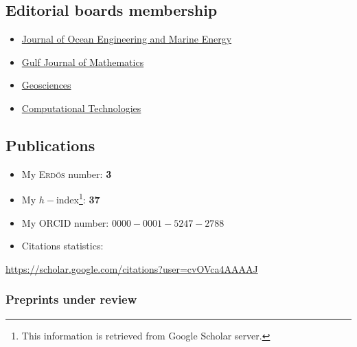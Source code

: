 \documentclass[final, a4paper, oneside, 12pt]{article}
\numberwithin{equation}{section}
\begin{document}
\begin{description}
\end{description}

\subsection{Editorial boards membership}

\begin{itemize}

  \item \href{https://www.springer.com/engineering/civil+engineering/journal/40722}{Journal of Ocean Engineering and Marine Energy}
  \item \href{https://gjom.org/index.php/gjom}{Gulf Journal of Mathematics}
  \item \href{https://www.mdpi.com/journal/geosciences/}{Geosciences}
  \item \href{http://www.ict.nsc.ru/jct/}{Computational Technologies}
  
\end{itemize}

\subsection{Publications}

\begin{itemize}
  \item My \textsc{Erd\H{o}s} number: \textbf{3}
  \item My $h-$index\footnote{This information is retrieved from Google Scholar server.}: \textbf{37}
  \item My ORCID number: $0000-0001-5247-2788$
\end{itemize}

\begin{itemize}
  \item Citations statistics:
\end{itemize}

\begin{center}
  \url{https://scholar.google.com/citations?user=cvOVca4AAAAJ}
\end{center}

\subsubsection{Preprints under review}
\end{document}
